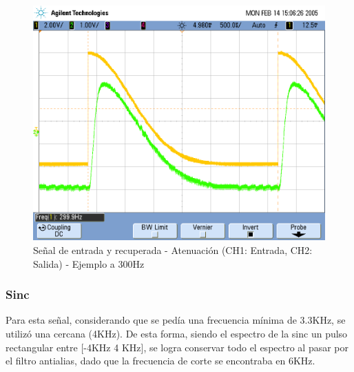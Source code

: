\documentclass[assd_tp3_main.tex]{subfiles}
\begin{document}
\begin{figure}[!ht]
\begin{centering}
\includegraphics[scale=0.25]{../EJ4/Mediciones/example.png}
\par\end{centering}
\caption{Señal de entrada y recuperada - Atenuación (CH1: Entrada, CH2: Salida) - Ejemplo a 300Hz}
\end{figure}

\subsubsection{Sinc}

Para esta señal, considerando que se pedía una frecuencia mínima de 3.3KHz, se utilizó una cercana (4KHz). De esta forma, siendo el espectro de la sinc un pulso rectangular entre [-4KHz 4 KHz], se logra conservar todo el espectro al pasar por el filtro antialias, dado que la frecuencia de corte se encontraba en 6KHz.
\end{document}
